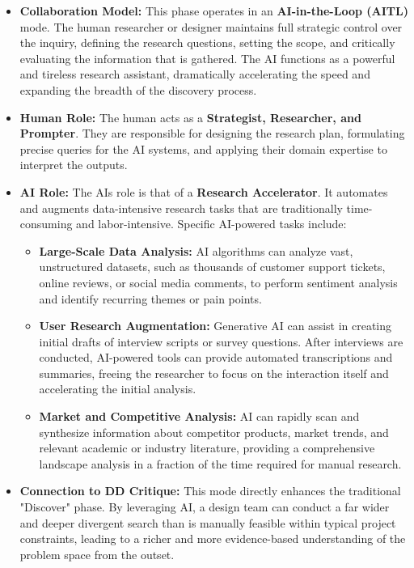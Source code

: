 \documentclass[
  12pt,
  a4paper,
  bibliography=totoc,
  numbers=noenddot
]{scrartcl}
\begin{document}
\begin{itemize}
\item
  \textbf{Collaboration Model:} This phase operates in an
  \textbf{AI-in-the-Loop (AITL)} mode. The human researcher or designer
  maintains full strategic control over the inquiry, defining the
  research questions, setting the scope, and critically evaluating the
  information that is gathered. The AI functions as a powerful and
  tireless research assistant, dramatically accelerating the speed and
  expanding the breadth of the discovery process.
\item
  \textbf{Human Role:} The human acts as a \textbf{Strategist,
  Researcher, and Prompter}. They are responsible for designing the
  research plan, formulating precise queries for the AI systems, and
  applying their domain expertise to interpret the outputs.
\item
  \textbf{AI Role:} The AI\textquotesingle s role is that of a
  \textbf{Research Accelerator}. It automates and augments
  data-intensive research tasks that are traditionally time-consuming
  and labor-intensive. Specific AI-powered tasks include:

  \begin{itemize}
  \item
    \textbf{Large-Scale Data Analysis:} AI algorithms can analyze vast,
    unstructured datasets, such as thousands of customer support
    tickets, online reviews, or social media comments, to perform
    sentiment analysis and identify recurring themes or pain
    points.\cite{cogleus2025rise}
  \item
    \textbf{User Research Augmentation:} Generative AI can assist in
    creating initial drafts of interview scripts or survey
    questions.\cite{cuny2025combining} After interviews are conducted,
    AI-powered tools can provide automated transcriptions and summaries,
    freeing the researcher to focus on the interaction itself and
    accelerating the initial analysis.\cite{ibm2025workflow}
  \item
    \textbf{Market and Competitive Analysis:} AI can rapidly scan and
    synthesize information about competitor products, market trends, and
    relevant academic or industry literature, providing a comprehensive
    landscape analysis in a fraction of the time required for manual
    research.\cite{maze2025double}
  \end{itemize}
\item
  \textbf{Connection to DD Critique:} This mode directly enhances the
  traditional "Discover" phase. By leveraging AI, a design team can
  conduct a far wider and deeper divergent search than is manually
  feasible within typical project constraints, leading to a richer and
  more evidence-based understanding of the problem space from the
  outset.
\end{itemize}
\end{document}
